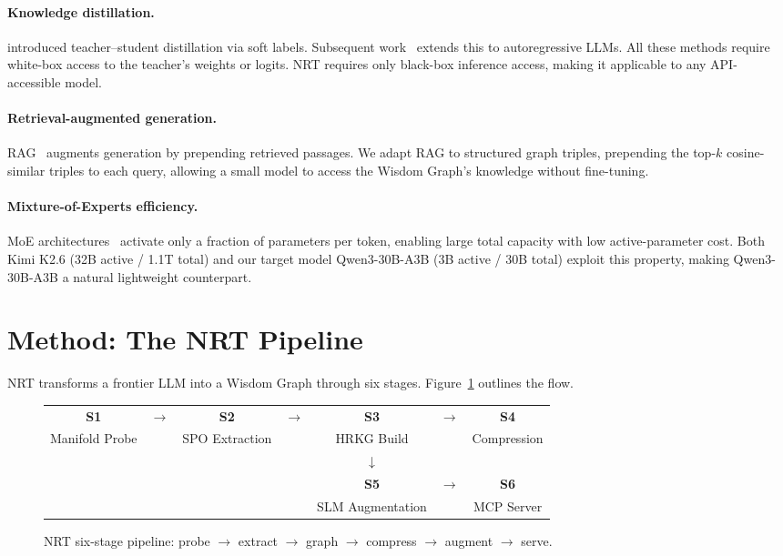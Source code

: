 \documentclass[11pt]{article}
\begin{document}
\paragraph{Knowledge distillation.}
\citet{hinton2015distilling} introduced teacher--student distillation via soft
labels.
Subsequent work~\citep{gu2024minillm,agarwal2024onpolicy} extends this to
autoregressive LLMs.
All these methods require white-box access to the teacher's weights or
logits.
NRT requires only black-box inference access, making it applicable to
any API-accessible model.

\paragraph{Retrieval-augmented generation.}
RAG~\citep{lewis2020retrieval} augments generation by prepending retrieved
passages.
We adapt RAG to structured graph triples, prepending the top-$k$ cosine-similar
triples to each query, allowing a small model to access the Wisdom Graph's
knowledge without fine-tuning.

\paragraph{Mixture-of-Experts efficiency.}
MoE architectures~\citep{shazeer2017outrageously,jiang2024mixtral} activate
only a fraction of parameters per token, enabling large total capacity with
low active-parameter cost.
Both Kimi K2.6 (32B active / 1.1T total) and our target model
Qwen3-30B-A3B (3B active / 30B total) exploit this property, making
Qwen3-30B-A3B a natural lightweight counterpart.

\section{Method: The NRT Pipeline}
\label{sec:method}

NRT transforms a frontier LLM into a Wisdom Graph through six stages.
Figure~\ref{fig:pipeline} outlines the flow.

\begin{figure}[h]
\centering
\small
\begin{tabular}{ccccccc}
\textbf{S1} & $\rightarrow$ & \textbf{S2} & $\rightarrow$ & \textbf{S3} &
$\rightarrow$ & \textbf{S4} \\
Manifold Probe & & SPO Extraction & & HRKG Build & & Compression \\[4pt]
& & & & $\downarrow$ & & \\
& & & & \textbf{S5} & $\rightarrow$ & \textbf{S6} \\
& & & & SLM Augmentation & & MCP Server \\
\end{tabular}
\caption{NRT six-stage pipeline: probe $\to$ extract $\to$ graph $\to$ compress
         $\to$ augment $\to$ serve.}
\label{fig:pipeline}
\end{figure}
\end{document}
